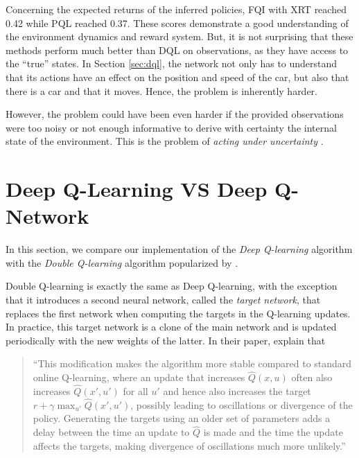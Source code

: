 \documentclass[a4paper, 12pt]{article}
\begin{document}
    Concerning the expected returns of the inferred policies, FQI with XRT reached \num{0.42} while PQL reached \num{0.37}. These scores demonstrate a good understanding of the environment dynamics and reward system. But, it is not surprising that these methods perform much better than DQL on observations, as they have access to the \enquote{true} states. In Section \ref{sec:dql}, the network not only has to understand that its actions have an effect on the position and speed of the car, but also that there is a car and that it moves. Hence, the problem is inherently harder.
    
    However, the problem could have been even harder if the provided observations were too noisy or not enough informative to derive with certainty the internal state of the environment. This is the problem of \emph{acting under uncertainty} \cite{mccallum1997reinforcement}.
    
    \section{Deep Q-Learning VS Deep Q-Network} \label{sec:dql.vs.dqn}
    
    In this section, we compare our implementation of the \emph{Deep Q-learning} algorithm with the \emph{Double Q-learning} \cite{hasselt2010double, ernstinfo8003qfunctions} algorithm popularized by \textcite{mnih2015human}.
    
    Double Q-learning is exactly the same as Deep Q-learning, with the exception that it introduces a second neural network, called the \emph{target network}, that replaces the first network when computing the targets in the Q-learning updates. In practice, this target network is a clone of the main network and is updated periodically with the new weights of the latter. In their paper, \textcite{mnih2015human} explain that
    
    \begin{quote}
        \enquote{This modification makes the algorithm more stable compared to standard online Q-learning, where an update that increases $\hat{Q}(x, u)$ often also increases $\hat{Q}(x', u')$ for all $u'$ and hence also increases the target $r + \gamma \max_{u'} \hat{Q}(x', u')$, possibly leading to oscillations or divergence of the policy. Generating the targets using an older set of parameters adds a delay between the time an update to $\hat{Q}$ is made and the time the update affects the targets, making divergence of oscillations much more unlikely.}
    \end{quote}
    
\end{document}
